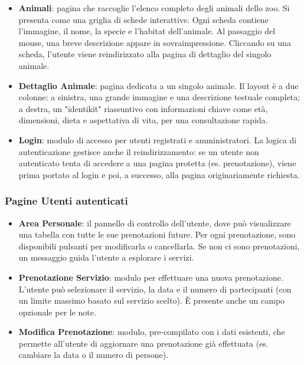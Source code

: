 \begin{itemize}
    \item \textbf{Animali}: pagina che raccoglie l'elenco completo degli animali dello zoo. Si presenta come una griglia di schede interattive. Ogni scheda contiene l'immagine, il nome, la specie e l'habitat dell'animale. Al passaggio del mouse, una breve descrizione appare in sovraimpressione. Cliccando su una scheda, l'utente viene reindirizzato alla pagina di dettaglio del singolo animale.
    
    \item \textbf{Dettaglio Animale}: pagina dedicata a un singolo animale. Il layout è a due colonne: a sinistra, una grande immagine e una descrizione testuale completa; a destra, un "identikit" riassuntivo con informazioni chiave come età, dimensioni, dieta e aspettativa di vita, per una consultazione rapida.
    
    \item \textbf{Login}: modulo di accesso per utenti registrati e amministratori. La logica di autenticazione gestisce anche il reindirizzamento: se un utente non autenticato tenta di accedere a una pagina protetta (es. prenotazione), viene prima portato al login e poi, a successo, alla pagina originariamente richiesta.
\end{itemize}
\subsubsection{Pagine Utenti autenticati}
\begin{itemize}
    \item \textbf{Area Personale}: il pannello di controllo dell'utente, dove può visualizzare una tabella con tutte le sue prenotazioni future. Per ogni prenotazione, sono disponibili pulsanti per modificarla o cancellarla. Se non ci sono prenotazioni, un messaggio guida l'utente a esplorare i servizi.

    \item \textbf{Prenotazione Servizio}: modulo per effettuare una nuova prenotazione. L'utente può selezionare il servizio, la data e il numero di partecipanti (con un limite massimo basato sul servizio scelto). È presente anche un campo opzionale per le note.
    
    \item \textbf{Modifica Prenotazione}: modulo, pre-compilato con i dati esistenti, che permette all'utente di aggiornare una prenotazione già effettuata (es. cambiare la data o il numero di persone).
\end{itemize}


